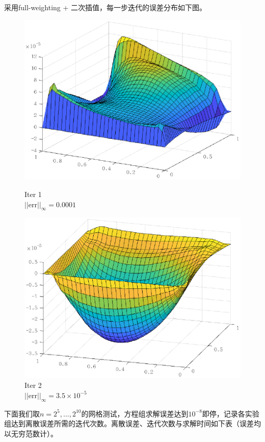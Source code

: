 \documentclass[lang=cn,10pt]{elegantbook}
\begin{document}
采用full-weighting + 二次插值，每一步迭代的误差分布如下图。
\begin{figure}[H]
  \centering
  \begin{minipage}[t]{0.22\linewidth}
      \centering
      \includegraphics[width=0.9\linewidth]{figure/3-5-9.eps}
      \caption*{\small Iter 1 \\ $||\text{err}||_\infty=0.0001$}
  \end{minipage}
  \hspace{1em}
  \begin{minipage}[t]{0.22\linewidth}
    \centering
    \includegraphics[width=0.9\linewidth]{figure/3-5-10.eps}
    \caption*{\small Iter 2 \\ $||\text{err}||_\infty=3.5\times 10^{-5}$}
  \end{minipage}
\end{figure}

下面我们取$n=2^{5},...,2^{10}$的网格测试，方程组求解误差达到$10^{-8}$即停，记录各实验组达到离散误差所需的迭代次数。离散误差、迭代次数与求解时间如下表（误差均以无穷范数计）。
\end{document}

